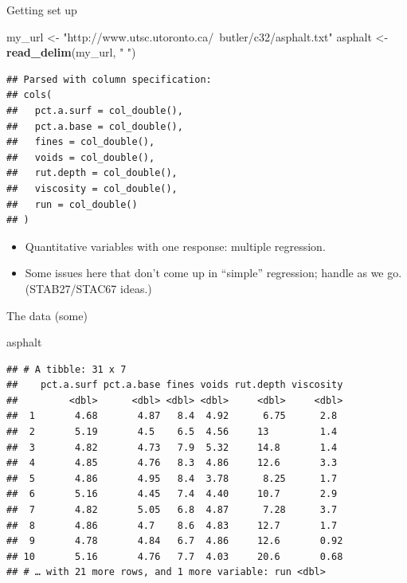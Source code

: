 \documentclass[ignorenonframetext,]{beamer}
\newenvironment{Shaded}{\begin{snugshade}}{\end{snugshade}}
\newcommand{\KeywordTok}[1]{\textcolor[rgb]{0.13,0.29,0.53}{\textbf{#1}}}
\newcommand{\NormalTok}[1]{#1}
\newcommand{\StringTok}[1]{\textcolor[rgb]{0.31,0.60,0.02}{#1}}
\providecommand{\tightlist}{%
  \setlength{\itemsep}{0pt}\setlength{\parskip}{0pt}}
\begin{document}
\begin{frame}[fragile]{Getting set up}
\protect\hypertarget{getting-set-up}{}

\begin{Shaded}
\begin{Highlighting}[]
\NormalTok{my_url <-}\StringTok{ "http://www.utsc.utoronto.ca/~butler/c32/asphalt.txt"}
\NormalTok{asphalt <-}\StringTok{ }\KeywordTok{read_delim}\NormalTok{(my_url, }\StringTok{" "}\NormalTok{)}
\end{Highlighting}
\end{Shaded}

\begin{verbatim}
## Parsed with column specification:
## cols(
##   pct.a.surf = col_double(),
##   pct.a.base = col_double(),
##   fines = col_double(),
##   voids = col_double(),
##   rut.depth = col_double(),
##   viscosity = col_double(),
##   run = col_double()
## )
\end{verbatim}

\begin{itemize}
\tightlist
\item
  Quantitative variables with one response: multiple regression.
\item
  Some issues here that don't come up in ``simple'' regression; handle
  as we go. (STAB27/STAC67 ideas.)
\end{itemize}

\end{frame}

\begin{frame}[fragile]{The data (some)}
\protect\hypertarget{the-data-some-3}{}

\begin{Shaded}
\begin{Highlighting}[]
\NormalTok{asphalt}
\end{Highlighting}
\end{Shaded}

\begin{verbatim}
## # A tibble: 31 x 7
##    pct.a.surf pct.a.base fines voids rut.depth viscosity
##         <dbl>      <dbl> <dbl> <dbl>     <dbl>     <dbl>
##  1       4.68       4.87   8.4  4.92      6.75      2.8 
##  2       5.19       4.5    6.5  4.56     13         1.4 
##  3       4.82       4.73   7.9  5.32     14.8       1.4 
##  4       4.85       4.76   8.3  4.86     12.6       3.3 
##  5       4.86       4.95   8.4  3.78      8.25      1.7 
##  6       5.16       4.45   7.4  4.40     10.7       2.9 
##  7       4.82       5.05   6.8  4.87      7.28      3.7 
##  8       4.86       4.7    8.6  4.83     12.7       1.7 
##  9       4.78       4.84   6.7  4.86     12.6       0.92
## 10       5.16       4.76   7.7  4.03     20.6       0.68
## # … with 21 more rows, and 1 more variable: run <dbl>
\end{verbatim}

\end{frame}
\end{document}
